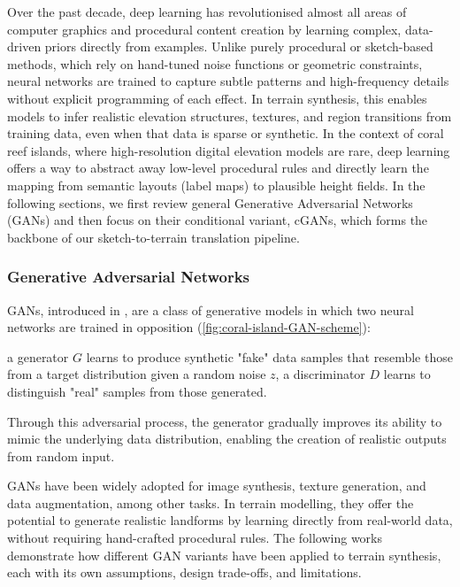 Over the past decade, deep learning has revolutionised almost all areas of computer graphics and procedural content creation by learning complex, data-driven priors directly from examples. Unlike purely procedural or sketch-based methods, which rely on hand-tuned noise functions or geometric constraints, neural networks are trained to capture subtle patterns and high-frequency details without explicit programming of each effect. In terrain synthesis, this enables models to infer realistic elevation structures, textures, and region transitions from training data, even when that data is sparse or synthetic. In the context of coral reef islands, where high-resolution digital elevation models are rare, deep learning offers a way to abstract away low-level procedural rules and directly learn the mapping from semantic layouts (label maps) to plausible height fields. 
In the following sections, we first review general Generative Adversarial Networks (GANs) and then focus on their conditional variant, cGANs, which forms the backbone of our sketch-to-terrain translation pipeline.

\subsubsection{Generative Adversarial Networks}
\label{sec:coral-island-sota-GAN}

GANs, introduced in \cite{Goodfellow2014}, are a class of generative models in which two neural networks are trained in opposition (\cref{fig:coral-island-GAN-scheme}): 
\begin{Itemize}
    \Item{} a generator $G$ learns to produce synthetic "fake" data samples that resemble those from a target distribution given a random noise $z$, 
    \Item{} a discriminator $D$ learns to distinguish "real" samples from those generated. 
\end{Itemize}

Through this adversarial process, the generator gradually improves its ability to mimic the underlying data distribution, enabling the creation of realistic outputs from random input.

GANs have been widely adopted for image synthesis, texture generation, and data augmentation, among other tasks. In terrain modelling, they offer the potential to generate realistic landforms by learning directly from real-world data, without requiring hand-crafted procedural rules. The following works demonstrate how different GAN variants have been applied to terrain synthesis, each with its own assumptions, design trade-offs, and limitations.

